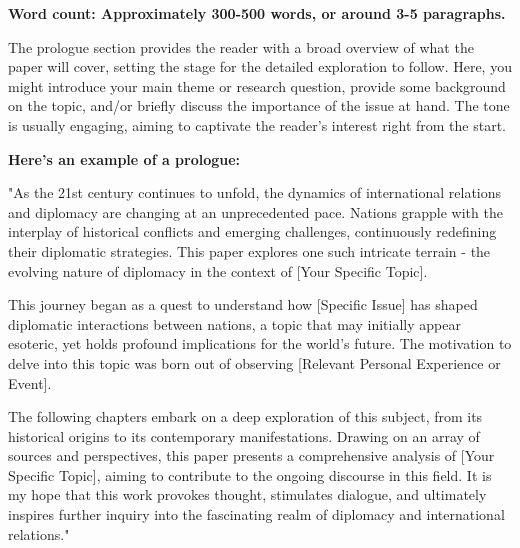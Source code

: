 
\textbf{Word count: Approximately 300-500 words, or around 3-5 paragraphs.}

The prologue section provides the reader with a broad overview of what the paper will cover, setting the stage for the detailed exploration to follow. Here, you might introduce your main theme or research question, provide some background on the topic, and/or briefly discuss the importance of the issue at hand. The tone is usually engaging, aiming to captivate the reader's interest right from the start.

\textbf{Here's an example of a prologue:}

"As the 21st century continues to unfold, the dynamics of international relations and diplomacy are changing at an unprecedented pace. Nations grapple with the interplay of historical conflicts and emerging challenges, continuously redefining their diplomatic strategies. This paper explores one such intricate terrain - the evolving nature of diplomacy in the context of [Your Specific Topic].

This journey began as a quest to understand how [Specific Issue] has shaped diplomatic interactions between nations, a topic that may initially appear esoteric, yet holds profound implications for the world's future. The motivation to delve into this topic was born out of observing [Relevant Personal Experience or Event].

The following chapters embark on a deep exploration of this subject, from its historical origins to its contemporary manifestations. Drawing on an array of sources and perspectives, this paper presents a comprehensive analysis of [Your Specific Topic], aiming to contribute to the ongoing discourse in this field. It is my hope that this work provokes thought, stimulates dialogue, and ultimately inspires further inquiry into the fascinating realm of diplomacy and international relations."
